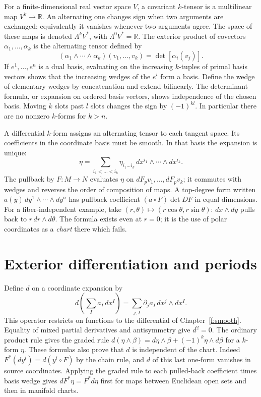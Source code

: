 For a finite-dimensional real vector space $V$, a covariant $k$-tensor is a multilinear map $V^k\to\mathbb R$. An alternating one changes sign when two arguments are exchanged; equivalently it vanishes whenever two arguments agree. The space of these maps is denoted $\Lambda^k V^*$, with $\Lambda^0 V^*=\mathbb R$. The exterior product of covectors $\alpha_1,\ldots,\alpha_k$ is the alternating tensor defined by
\[
 (\alpha_1\wedge\cdots\wedge\alpha_k)(v_1,\ldots,v_k)=\det[\alpha_i(v_j)] .
\]
If $e^1,\ldots,e^n$ is a dual basis, evaluating on the increasing $k$-tuples of primal basis vectors shows that the increasing wedges of the $e^i$ form a basis. Define the wedge of elementary wedges by concatenation and extend bilinearly. The determinant formula, or expansion on ordered basis vectors, shows independence of the chosen basis. Moving $k$ slots past $l$ slots changes the sign by $(-1)^{kl}$. In particular there are no nonzero $k$-forms for $k>n$.

A differential $k$-form assigns an alternating tensor to each tangent space. Its coefficients in the coordinate basis must be smooth. In that basis the expansion is unique:
\[
 \eta=\sum_{i_1<\dots<i_k}\eta_{i_1\ldots i_k}\,dx^{i_1}\wedge\cdots\wedge dx^{i_k}.
\]
The pullback by $F:M\to N$ evaluates $\eta$ on $dF_p v_1,\ldots,dF_p v_k$; it commutes with wedges and reverses the order of composition of maps. A top-degree form written $a(y)\,dy^1\wedge\cdots\wedge dy^n$ has pullback coefficient $(a\circ F)\det DF$ in equal dimensions. For a fiber-independent example, take $(r,\theta)\mapsto(r\cos\theta,r\sin\theta)$: $dx\wedge dy$ pulls back to $r\,dr\wedge d\theta$. The formula exists even at $r=0$; it is the use of polar coordinates as a \emph{chart} there which fails.

\section{Exterior differentiation and periods}\label{f:exterior}
Define $d$ on a coordinate expansion by
\[
 d\!\left(\sum_I a_I\,dx^I\right)=\sum_{j,I}\partial_j a_I\,dx^j\wedge dx^I .
\]
This operator restricts on functions to the differential of Chapter~\ref{f:smooth}. Equality of mixed partial derivatives and antisymmetry give $d^2=0$. The ordinary product rule gives the graded rule $d(\eta\wedge\beta)=d\eta\wedge\beta+(-1)^k\eta\wedge d\beta$ for a $k$-form $\eta$. These formulas also prove that $d$ is independent of the chart. Indeed $F^*(dy^i)=d(y^i\circ F)$ by the chain rule, and $d$ of this last one-form vanishes in source coordinates. Applying the graded rule to each pulled-back coefficient times basis wedge gives $dF^*\eta=F^*d\eta$ first for maps between Euclidean open sets and then in manifold charts.

